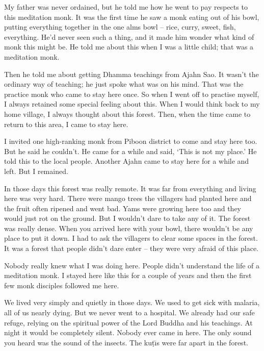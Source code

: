 My father was never ordained, but he told me how he went to pay respects to this meditation monk. It was the first time he saw a monk eating out of his bowl, putting everything together in the one alms bowl -- rice, curry, sweet, fish, everything. He'd never seen such a thing, and it made him wonder what kind of monk this might be. He told me about this when I was a little child; that was a meditation monk. 

Then he told me about getting Dhamma teachings from Ajahn Sao. It wasn't the ordinary way of teaching; he just spoke what was on his mind. That was the practice monk who came to stay here once. So when I went off to practise myself, I always retained some special feeling about this. When I would think back to my home village, I always thought about this forest. Then, when the time came to return to this area, I came to stay here. 

I invited one high-ranking monk from Piboon district to come and stay here too. But he said he couldn't. He came for a while and said, `This is not my place.' He told this to the local people. Another Ajahn came to stay here for a while and left. But I remained. 

In those days this forest was really remote. It was far from everything and living here was very hard. There were mango trees the villagers had planted here and the fruit often ripened and went bad. Yams were growing here too and they would just rot on the ground. But I wouldn't dare to take any of it. The forest was really dense. When you arrived here with your bowl, there wouldn't be any place to put it down. I had to ask the villagers to clear some spaces in the forest. It was a forest that people didn't dare enter -- they were very afraid of this place. 

Nobody really knew what I was doing here. People didn't understand the life of a meditation monk. I stayed here like this for a couple of years and then the first few monk disciples followed me here. 

We lived very simply and quietly in those days. We used to get sick with malaria, all of us nearly dying. But we never went to a hospital. We already had our safe refuge, relying on the spiritual power of the Lord Buddha and his teachings. At night it would be completely silent. Nobody ever came in here. The only sound you heard was the sound of the insects. The ku\d{t}\={\i}s were far apart in the forest. 

